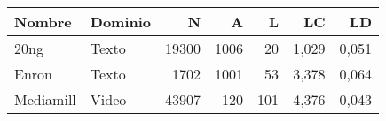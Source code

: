 \begin{tabular}{llrrrrr}
	\toprule
	Nombre    & Dominio & N     & A    & L   & LC    & LD    \\
	\midrule
	20ng      & Texto   & 19300 & 1006 & 20  & 1,029 & 0,051 \\
	Enron     & Texto   & 1702  & 1001 & 53  & 3,378 & 0,064 \\
	Mediamill & Video   & 43907 & 120  & 101 & 4,376 & 0,043 \\
	\bottomrule
\end{tabular}
